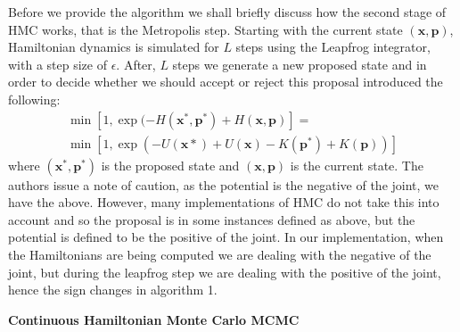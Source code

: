 \documentclass[twoside]{article}
\begin{document}
Before we provide the algorithm we shall briefly discuss how the second stage of HMC works, that is the Metropolis step. Starting with the current state $(\textbf{x},\textbf{p})$, Hamiltonian dynamics is simulated for $L$ steps using the Leapfrog integrator, with a step size of $\epsilon$. After, $L$ steps we generate a new proposed state and in order to decide whether we should accept or reject this proposal \citep{duane1987hybrid} introduced the following:
\begin{multline}
\min[1, \exp(-H(\textbf{x}^{*}, \textbf{p}^{*}) + H(\textbf{x}, \textbf{p})] =\\
\min[1, \exp(-U(\textbf{x}{*}) + U(\textbf{x}) - K(\textbf{p}^{*}) + K(\textbf{p}))]
\end{multline}where $ (\textbf{x}^{*}, \textbf{p}^{*})$ is the proposed state and $(\textbf{x}, \textbf{p})$ is the current state. The authors issue a note of caution, as the potential is the negative of the joint, we have the above. However, many implementations of HMC do not take this into account and so the proposal is in some instances defined as above, but the potential is defined to be the positive of the joint. In our implementation, when the Hamiltonians are being computed we are dealing with the negative of the joint, but during the leapfrog step we are dealing with the positive of the joint, hence the sign changes in algorithm 1.  
\begin{algorithm}
	\label{alg:simpHMC}
	\caption{\textbf{Continuous Hamiltonian Monte Carlo MCMC}}
	\begin{algorithmic}[1]
		\EndFor
		  
		\Else
		 
		\EndIf
		\EndFor
		\EndProcedure
	\end{algorithmic} 
\end{algorithm}
\end{document}
